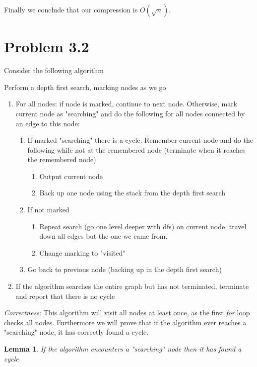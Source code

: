 \documentclass{article}
\newtheorem{lemma}[theorem]{Lemma}
\begin{document}
Finally we conclude that our compression is $O(\sqrt{n})$.

\section{Problem 3.2}
Consider the following algorithm

Perform a depth first search, marking nodes as we go
\begin{enumerate}
\item For all nodes: if node is marked, continue to next node. Otherwise, mark current node as "searching" and do the following for all nodes connected by an edge to this node:
\begin{enumerate}
\item If marked "searching" there is a cycle. Remember current node and do the following while not at the remembered node (terminate when it reaches the remembered node)
\begin{enumerate}
\item Output current node
\item Back up one node using the stack from the depth first search
\end{enumerate}
\item If not marked
\begin{enumerate}
\item Repeat search (go one level deeper with dfs) on current node, travel down all edges but the one we came from.
   \item Change marking to "visited"

\end{enumerate}
      \item Go back to previous node (backing up in the depth first search)
\end{enumerate}
\item If the algorithm searches the entire graph but has not terminated, terminate and report that there is no cycle
\end{enumerate}


\emph{Correctness:}
This algorithm will visit all nodes at least once, as the first \emph{for} loop checks all nodes. Furthermore we will prove that if the algorithm ever reaches a "searching" node, it has correctly found a cycle.

\begin{lemma}
If the algorithm encounters a "searching" node then it has found a cycle
\end{lemma}
\end{document}
